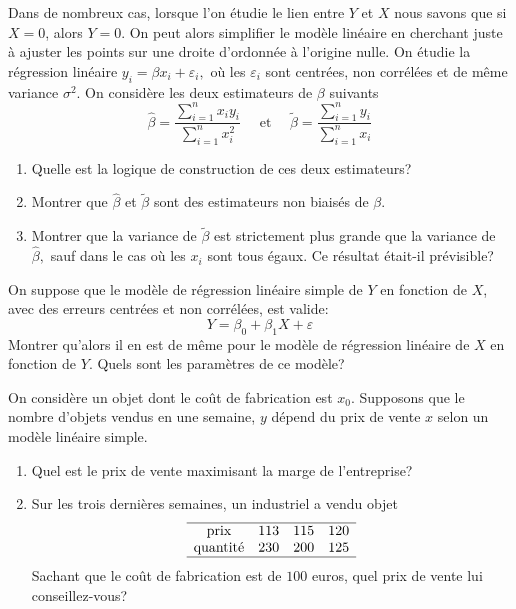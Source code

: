 \documentclass{td_um}
\providecommand{\1}{\mathds{1}}
\begin{document}
\cor{\newpage}

\exo{}
Dans de nombreux cas, lorsque l'on étudie le lien entre $Y$ et $X$ nous savons que si $X=0$, alors $Y=0$. On peut alors simplifier le modèle linéaire en cherchant juste à ajuster les points sur une droite d'ordonnée à l'origine nulle. On étudie la régression linéaire $y_{i}=\beta x_{i}+\varepsilon_{i},$ où les $\varepsilon_{i}$ sont centrées, non corrélées et de même variance $\sigma^{2}$. On considère les deux estimateurs de $\beta$ suivants
\[
\hat{\beta}=\frac{\sum_{i=1}^{n} x_{i} y_{i}}{\sum_{i=1}^{n} x_{i}^{2}} \quad \text { et } \quad \tilde{\beta}=\frac{\sum_{i=1}^{n} y_{i}}{\sum_{i=1}^{n} x_{i}}
\]
\begin{enumerate}
    \item  Quelle est la logique de construction de ces deux estimateurs?
    \item   Montrer que $\hat{\beta}$ et $\tilde{\beta}$ sont des estimateurs non biaisés de $\beta$.
    \item   Montrer que la variance de $\tilde{\beta}$ est strictement plus grande que la variance de
        $\hat{\beta},$ sauf dans le cas où les $x_{i}$ sont tous égaux. Ce résultat était-il prévisible?
\end{enumerate}


\cor{\newpage}

\exo{}
On suppose que le modèle de régression linéaire simple de $Y$ en fonction de $X$, avec des erreurs centrées et non corrélées, est valide:
\[
Y=\beta_{0}+\beta_{1} X+\varepsilon
\]
Montrer qu'alors il en est de même pour le modèle de régression linéaire de $X$ en fonction de $Y$. Quels sont les paramètres de ce modèle?


\cor{\newpage}

\exo{}
On considère un objet dont le coût de fabrication est $x_{0}$. Supposons que le nombre d'objets vendus en une semaine, $y$ dépend du prix de vente $x$ selon un modèle linéaire simple.
\begin{enumerate}
    \item  Quel est le prix de vente maximisant la marge de l'entreprise?
    \item  Sur les trois dernières semaines, un industriel a vendu objet
    \[
            \begin{array}[]{cccc}
                \hline
                \text{prix} & 113 & 115 & 120 \\
                \text{quantité} & 230 & 200 & 125 \\
                \hline
            \end{array}
        \]
        Sachant que le coût de fabrication est de $100$ euros, quel prix de vente lui conseillez-vous?
\end{enumerate}
\end{document}
